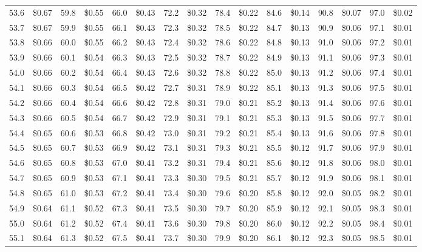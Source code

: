 \documentclass{article}
\begin{document}
\begin{tabular}{|*{8}{rr|}}
53.6 & \$0.67 & 59.8 & \$0.55 & 66.0 & \$0.43 & 72.2 & \$0.32 & 78.4 & \$0.22 & 84.6 & \$0.14 & 90.8 & \$0.07 & 97.0 & \$0.02\\
53.7 & \$0.67 & 59.9 & \$0.55 & 66.1 & \$0.43 & 72.3 & \$0.32 & 78.5 & \$0.22 & 84.7 & \$0.13 & 90.9 & \$0.06 & 97.1 & \$0.01\\
53.8 & \$0.66 & 60.0 & \$0.55 & 66.2 & \$0.43 & 72.4 & \$0.32 & 78.6 & \$0.22 & 84.8 & \$0.13 & 91.0 & \$0.06 & 97.2 & \$0.01\\
53.9 & \$0.66 & 60.1 & \$0.54 & 66.3 & \$0.43 & 72.5 & \$0.32 & 78.7 & \$0.22 & 84.9 & \$0.13 & 91.1 & \$0.06 & 97.3 & \$0.01\\
54.0 & \$0.66 & 60.2 & \$0.54 & 66.4 & \$0.43 & 72.6 & \$0.32 & 78.8 & \$0.22 & 85.0 & \$0.13 & 91.2 & \$0.06 & 97.4 & \$0.01\\
54.1 & \$0.66 & 60.3 & \$0.54 & 66.5 & \$0.42 & 72.7 & \$0.31 & 78.9 & \$0.22 & 85.1 & \$0.13 & 91.3 & \$0.06 & 97.5 & \$0.01\\
54.2 & \$0.66 & 60.4 & \$0.54 & 66.6 & \$0.42 & 72.8 & \$0.31 & 79.0 & \$0.21 & 85.2 & \$0.13 & 91.4 & \$0.06 & 97.6 & \$0.01\\
54.3 & \$0.66 & 60.5 & \$0.54 & 66.7 & \$0.42 & 72.9 & \$0.31 & 79.1 & \$0.21 & 85.3 & \$0.13 & 91.5 & \$0.06 & 97.7 & \$0.01\\
54.4 & \$0.65 & 60.6 & \$0.53 & 66.8 & \$0.42 & 73.0 & \$0.31 & 79.2 & \$0.21 & 85.4 & \$0.13 & 91.6 & \$0.06 & 97.8 & \$0.01\\
54.5 & \$0.65 & 60.7 & \$0.53 & 66.9 & \$0.42 & 73.1 & \$0.31 & 79.3 & \$0.21 & 85.5 & \$0.12 & 91.7 & \$0.06 & 97.9 & \$0.01\\
54.6 & \$0.65 & 60.8 & \$0.53 & 67.0 & \$0.41 & 73.2 & \$0.31 & 79.4 & \$0.21 & 85.6 & \$0.12 & 91.8 & \$0.06 & 98.0 & \$0.01\\
54.7 & \$0.65 & 60.9 & \$0.53 & 67.1 & \$0.41 & 73.3 & \$0.30 & 79.5 & \$0.21 & 85.7 & \$0.12 & 91.9 & \$0.06 & 98.1 & \$0.01\\
54.8 & \$0.65 & 61.0 & \$0.53 & 67.2 & \$0.41 & 73.4 & \$0.30 & 79.6 & \$0.20 & 85.8 & \$0.12 & 92.0 & \$0.05 & 98.2 & \$0.01\\
54.9 & \$0.64 & 61.1 & \$0.52 & 67.3 & \$0.41 & 73.5 & \$0.30 & 79.7 & \$0.20 & 85.9 & \$0.12 & 92.1 & \$0.05 & 98.3 & \$0.01\\
55.0 & \$0.64 & 61.2 & \$0.52 & 67.4 & \$0.41 & 73.6 & \$0.30 & 79.8 & \$0.20 & 86.0 & \$0.12 & 92.2 & \$0.05 & 98.4 & \$0.01\\
55.1 & \$0.64 & 61.3 & \$0.52 & 67.5 & \$0.41 & 73.7 & \$0.30 & 79.9 & \$0.20 & 86.1 & \$0.12 & 92.3 & \$0.05 & 98.5 & \$0.01\\

\end{tabular}
\end{document}
